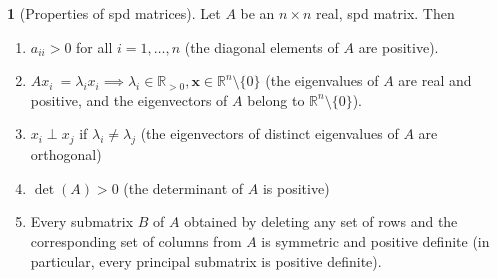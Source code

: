 \documentclass[12pt]{article}
\theoremstyle{definition}
\newcommand{\R}{\mathbb{R}}
\newcommand{\x}{\bm{x}}
\newtheorem{theorem}{\color{ForestGreen}{\textbf{Theorem}}}
\theoremstyle{definition}
\begin{document}
\begin{theorem}[Properties of spd matrices]
Let $A$ be an $n \times n$ real, spd matrix. Then
\begin{enumerate}
	\item $a_{ii} > 0$ for all $i=1, \ldots, n$ (the diagonal elements of $A$ are positive). 
	\item $A x_i \ = \lambda_i x_i \implies \lambda_i \in \R_{>0}, \x \in \R^n \setminus \{0\}$ (the eigenvalues of $A$ are real and positive, and the eigenvectors of $A$ belong to $\R^n \setminus \{0\}$).
	\item $x_i \perp x_j$ if $\lambda_i \neq \lambda_j$ (the eigenvectors of distinct eigenvalues of $A$ are orthogonal)
	\item $\det(A) > 0$ (the determinant of $A$ is positive)
	\item Every submatrix $B$ of $A$ obtained by deleting any set of rows and the corresponding set of columns from $A$ is symmetric and positive definite (in particular, every principal submatrix is positive definite). 
\end{enumerate}
\end{theorem}
\end{document}
